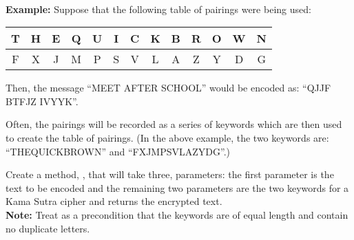 \begin{questions}
    \\[4pt]
    {\small\textbf{Example:} Suppose that the following table of pairings were being used:
      \begin{center}
        \begin{tabular}{| c | c | c | c | c | c | c | c | c | c | c | c | c |}
          \hline
          T & H & E & Q & U & I & C & K & B & R & O & W & N\\
          \hline
          F & X & J & M & P & S & V & L & A & Z & Y & D & G\\
          \hline
        \end{tabular}
      \end{center}
    Then, the message ``MEET AFTER SCHOOL'' would be encoded as: ``QJJF BTFJZ IVYYK''.

    Often, the pairings will be recorded as a series of keywords which are then used to create the table of pairings. (In the above example, the two keywords are: ``THEQUICKBROWN'' and ``FXJMPSVLAZYDG''.)}

    Create a method, , that will take three,  parameters: the first parameter is the text to be encoded and the remaining two parameters are the two keywords for a Kama Sutra cipher and returns the encrypted text.\\
    {\small\textbf{Note:} Treat as a precondition that the keywords are of equal length and contain no duplicate letters.}
  \end{questions}

